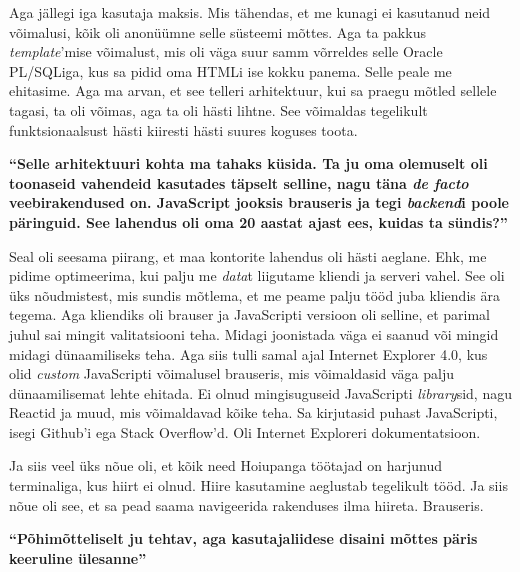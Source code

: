 Aga jällegi iga kasutaja maksis. Mis tähendas, et me kunagi ei kasutanud neid võimalusi, kõik oli anonüümne selle süsteemi mõttes. Aga ta pakkus \emph{template}'mise võimalust, mis oli väga suur samm võrreldes selle Oracle PL/SQLiga, kus sa pidid oma HTMLi ise kokku panema. Selle peale me ehitasime. Aga ma arvan, et see telleri arhitektuur, kui sa praegu mõtled sellele tagasi, ta oli võimas, aga ta oli hästi lihtne. See võimaldas tegelikult funktsionaalsust hästi kiiresti hästi suures koguses toota.

\textbf{\enquote{Selle arhitektuuri kohta ma tahaks küsida. Ta ju oma olemuselt oli toonaseid vahendeid kasutades täpselt selline, nagu täna \emph{de facto} veebirakendused on. JavaScript jooksis brauseris ja tegi \emph{backend}i poole päringuid. See lahendus oli oma 20 aastat ajast ees, kuidas ta sündis?}}

Seal oli seesama piirang, et maa kontorite lahendus oli hästi aeglane. Ehk, me pidime optimeerima, kui palju me \emph{data}t liigutame kliendi ja serveri vahel. See oli üks nõudmistest, mis sundis mõtlema, et me peame palju tööd juba kliendis ära tegema. Aga kliendiks oli brauser ja JavaScripti versioon oli selline, et parimal juhul sai mingit valitatsiooni teha. Midagi joonistada väga ei saanud või mingid midagi dünaamiliseks teha. Aga siis tulli samal ajal Internet Explorer 4.0, kus olid \emph{custom} JavaScripti võimalusel brauseris, mis võimaldasid väga palju dünaamilisemat lehte ehitada. Ei olnud mingisuguseid JavaScripti \emph{library}sid, nagu Reactid ja muud, mis võimaldavad kõike teha. Sa kirjutasid puhast JavaScripti, isegi Github'i ega Stack Overflow'd. Oli Internet Exploreri dokumentatsioon.

Ja siis veel üks nõue oli, et kõik need Hoiupanga töötajad on harjunud terminaliga, kus  hiirt ei olnud. Hiire kasutamine aeglustab tegelikult tööd. Ja siis nõue oli see, et sa pead saama navigeerida rakenduses ilma hiireta. Brauseris. 

\textbf{\enquote{Põhimõtteliselt ju tehtav, aga kasutajaliidese disaini mõttes päris keeruline ülesanne}}

